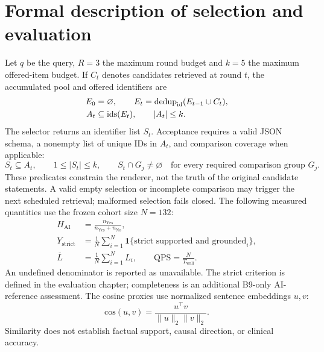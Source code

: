 \section{Formal description of selection and evaluation}
Let \(q\) be the query, \(R=3\) the maximum round budget and \(k=5\) the maximum offered-item budget. If \(C_t\) denotes candidates retrieved at round \(t\), the accumulated pool and offered identifiers are
\begin{align}
 E_0 &= \varnothing, \qquad E_t = \operatorname{dedup}_{\rm id}(E_{t-1}\cup C_t),\\
 A_t &\subseteq \operatorname{ids}(E_t),\qquad |A_t|\le k.
\end{align}
The selector returns an identifier list \(S_t\). Acceptance requires a valid JSON schema, a nonempty list of unique IDs in \(A_t\), and comparison coverage when applicable:
\begin{equation}
  S_t\subseteq A_t,\qquad 1\le |S_t|\le k,\qquad
  S_t\cap G_j\ne\varnothing\quad\text{for every required comparison group }G_j.
\end{equation}
These predicates constrain the renderer, not the truth of the original candidate statements. A valid empty selection or incomplete comparison may trigger the next scheduled retrieval; malformed selection fails closed. The following measured quantities use the frozen cohort size \(N=132\):
\begin{align}
 H_{\mathrm{AI}} &= \frac{n_{\mathrm{Yes}}}{n_{\mathrm{Yes}}+n_{\mathrm{No}}},\\
 Y_{\mathrm{strict}} &= \frac{1}{N}\sum_{i=1}^{N}\mathbf{1}\{\text{strict supported and grounded}_i\},\\
 \overline{L} &= \frac{1}{N}\sum_{i=1}^{N} L_i,\qquad
 \mathrm{QPS}=\frac{N}{T_{\mathrm{wall}}}.
\end{align}
An undefined denominator is reported as unavailable. The strict criterion is defined in the evaluation chapter; completeness is an additional B9-only AI-reference assessment. The cosine proxies use normalized sentence embeddings \(u,v\):
\[
 \mathrm{cos}(u,v)=\frac{u^\top v}{\lVert u\rVert_2\lVert v\rVert_2}.
\]
Similarity does not establish factual support, causal direction, or clinical accuracy.
